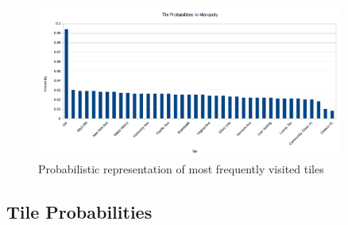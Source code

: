 \documentclass[12pt]{article}
\begin{document}
\begin{figure}[h]
\centering
\includegraphics[width=0.9\textwidth]{tile_prob_graph.png}
\caption{Probabilistic representation of most frequently visited tiles}
\end{figure}
\subsection{Tile Probabilities}
\end{document}

